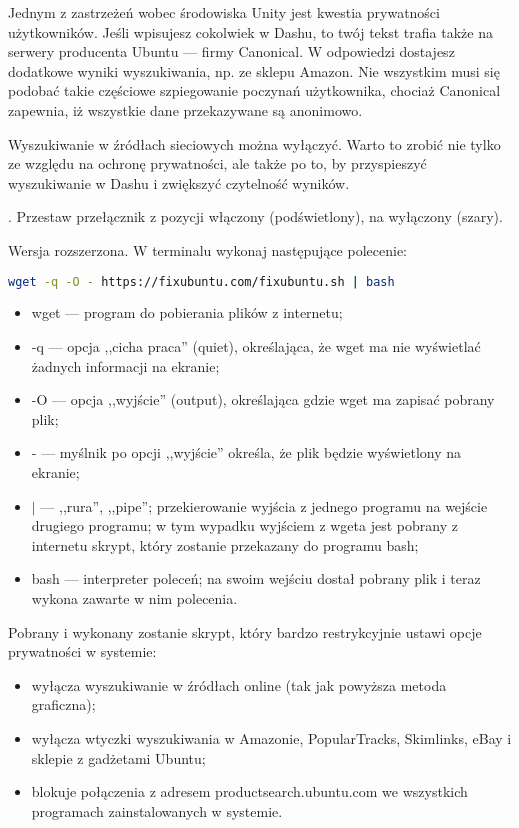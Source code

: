 Jednym z zastrzeżeń wobec środowiska Unity jest kwestia prywatności użytkowników. Jeśli wpisujesz cokolwiek w Dashu, to twój tekst trafia także na serwery producenta Ubuntu --- firmy Canonical. W odpowiedzi dostajesz dodatkowe wyniki wyszukiwania, np. ze sklepu Amazon. Nie wszystkim musi się podobać takie częściowe szpiegowanie poczynań użytkownika, chociaż Canonical zapewnia, iż wszystkie dane przekazywane są anonimowo.

Wyszukiwanie w źródłach sieciowych można wyłączyć. Warto to zrobić nie tylko ze względu na ochronę prywatności, ale także po to, by przyspieszyć wyszukiwanie w Dashu i zwiększyć czytelność wyników.

\noindent {}. Przestaw przełącznik z pozycji włączony (podświetlony), na wyłączony (szary).

Wersja rozszerzona. W terminalu wykonaj następujące polecenie:
\begin{lstlisting}[language=bash]
wget -q -O - https://fixubuntu.com/fixubuntu.sh | bash
\end{lstlisting}
\begin{itemize}
\item \textcolor{ubuntu_orange}{wget} --- program do pobierania plików z internetu;
\item \textcolor{ubuntu_orange}{-q} --- opcja ,,cicha praca'' (quiet), określająca, że wget ma nie wyświetlać żadnych informacji na ekranie;
\item \textcolor{ubuntu_orange}{-O} --- opcja ,,wyjście'' (output), określająca gdzie wget ma zapisać pobrany plik;
\item \textcolor{ubuntu_orange}{-} --- myślnik po opcji ,,wyjście'' określa, że plik będzie wyświetlony na ekranie;
\item \textcolor{ubuntu_orange}{$|$} --- ,,rura'', ,,pipe''; przekierowanie wyjścia z jednego programu na wejście drugiego programu; w tym wypadku wyjściem z wgeta jest pobrany z internetu skrypt, który zostanie przekazany do programu bash;
\item \textcolor{ubuntu_orange}{bash} --- interpreter poleceń; na swoim wejściu dostał pobrany plik i teraz wykona zawarte w nim polecenia.
\end{itemize}
Pobrany i wykonany zostanie skrypt, który bardzo restrykcyjnie ustawi opcje prywatności w systemie:
\begin{itemize}
\item wyłącza wyszukiwanie w źródłach online (tak jak powyższa metoda graficzna);
\item wyłącza wtyczki wyszukiwania w Amazonie, PopularTracks, Skimlinks, eBay i sklepie z gadżetami Ubuntu;
\item blokuje połączenia z adresem productsearch.ubuntu.com we wszystkich programach zainstalowanych w systemie.
\end{itemize}
